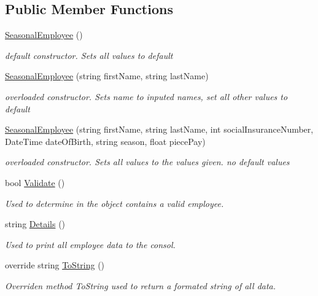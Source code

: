 \subsection*{Public Member Functions}
\begin{DoxyCompactItemize}
\item 
\hyperlink{class_all_employees_1_1_seasonal_employee_a2206a19da96d42cbd56e7fb5d073c7d4}{Seasonal\+Employee} ()
\begin{DoxyCompactList}\small\item\em default constructor. Sets all values to default \end{DoxyCompactList}\item 
\hyperlink{class_all_employees_1_1_seasonal_employee_acc7fb6022faa7594a0e249a8ba89f217}{Seasonal\+Employee} (string first\+Name, string last\+Name)
\begin{DoxyCompactList}\small\item\em overloaded constructor. Sets name to inputed names, set all other values to default \end{DoxyCompactList}\item 
\hyperlink{class_all_employees_1_1_seasonal_employee_a11c78ec2f72bdeb29d71d48497e34c63}{Seasonal\+Employee} (string first\+Name, string last\+Name, int social\+Insurance\+Number, Date\+Time date\+Of\+Birth, string season, float piece\+Pay)
\begin{DoxyCompactList}\small\item\em overloaded constructor. Sets all values to the values given. no default values \end{DoxyCompactList}\item 
bool \hyperlink{class_all_employees_1_1_seasonal_employee_a70f911ac43a67b84f93ead74860bb6d9}{Validate} ()
\begin{DoxyCompactList}\small\item\em Used to determine in the object contains a valid employee. \end{DoxyCompactList}\item 
string \hyperlink{class_all_employees_1_1_seasonal_employee_a0474e4afe0e11f4e2dd0a523bff3034b}{Details} ()
\begin{DoxyCompactList}\small\item\em Used to print all employee data to the consol. \end{DoxyCompactList}\item 
override string \hyperlink{class_all_employees_1_1_seasonal_employee_a797da83b3ef0a5e7fb04fc5b0d373a11}{To\+String} ()
\begin{DoxyCompactList}\small\item\em Overriden method To\+String used to return a formated string of all data. \end{DoxyCompactList}\item 

\end{DoxyCompactItemize}
